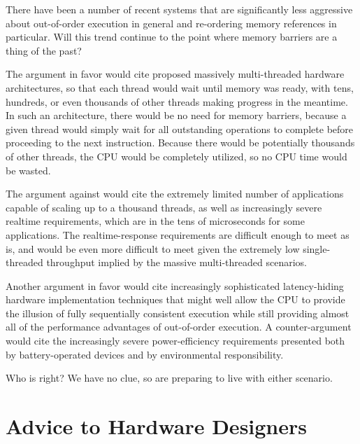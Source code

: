 There have been a number of recent systems that are significantly less
aggressive about out-of-order execution in general and re-ordering
memory references in particular.
Will this trend continue to the point where memory barriers are a thing
of the past?

The argument in favor would cite proposed massively multi-threaded hardware
architectures, so that each thread would wait until memory was ready,
with tens, hundreds, or even thousands of other threads making progress
in the meantime.
In such an architecture, there would be no need for memory barriers,
because a given thread would simply wait for all outstanding operations
to complete before proceeding to the next instruction.
Because there would be potentially thousands of other threads, the
CPU would be completely utilized, so no CPU time would be wasted.

The argument against would cite the extremely limited number of applications
capable of scaling up to a thousand threads, as well as increasingly
severe realtime requirements, which are in the tens of microseconds
for some applications.
The realtime-response requirements are difficult enough to meet as is,
and would be even more difficult to meet given the extremely low
single-threaded throughput implied by the massive multi-threaded
scenarios.

Another argument in favor would cite increasingly sophisticated
latency-hiding hardware implementation techniques that might well allow
the CPU to provide the illusion of fully sequentially consistent
execution while still providing almost all of the performance advantages
of out-of-order execution.
A counter-argument would cite the increasingly severe power-efficiency
requirements presented both by battery-operated devices and by
environmental responsibility.

Who is right?
We have no clue, so are preparing to live with either scenario.

\section{Advice to Hardware Designers}
\label{sec:app:whymb:Advice to Hardware Designers}

